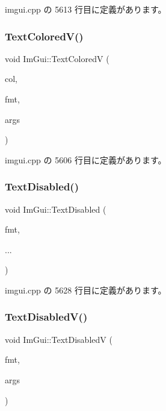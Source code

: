  imgui.\+cpp の 5613 行目に定義があります。

\mbox{\label{namespace_im_gui_a87c24ece994188a7145d8feecb4439ed}} 
\subsubsection{\texorpdfstring{Text\+Colored\+V()}{TextColoredV()}}
{\footnotesize\ttfamily void Im\+Gui\+::\+Text\+ColoredV (\begin{DoxyParamCaption}\item[{const \mbox{\hyperlink{struct_im_vec4}{Im\+Vec4}} \&}]{col,  }\item[{const char $\ast$}]{fmt,  }\item[{va\+\_\+list}]{args }\end{DoxyParamCaption})}



 imgui.\+cpp の 5606 行目に定義があります。

\mbox{\label{namespace_im_gui_aa96bf14c5fa288e106820aeb4ba7fcb6}} 
\subsubsection{\texorpdfstring{Text\+Disabled()}{TextDisabled()}}
{\footnotesize\ttfamily void Im\+Gui\+::\+Text\+Disabled (\begin{DoxyParamCaption}\item[{const char $\ast$}]{fmt,  }\item[{}]{... }\end{DoxyParamCaption})}



 imgui.\+cpp の 5628 行目に定義があります。

\mbox{\label{namespace_im_gui_a5b128d4f12d7e33e95fb9cef7dce027e}} 
\subsubsection{\texorpdfstring{Text\+Disabled\+V()}{TextDisabledV()}}
{\footnotesize\ttfamily void Im\+Gui\+::\+Text\+DisabledV (\begin{DoxyParamCaption}\item[{const char $\ast$}]{fmt,  }\item[{va\+\_\+list}]{args }\end{DoxyParamCaption})}



